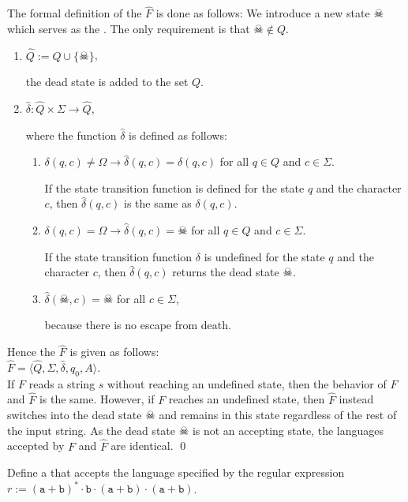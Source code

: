 The formal definition of the  $\widehat{F}$ is done as follows:
We introduce a new state $\skull$ which serves as the .  The only requirement is that $\skull \not\in Q$.
\begin{enumerate}
\item $\widehat{Q} := Q \cup \{ \skull \}$,

      the dead state is added to the set  $Q$.
\item $\widehat{\delta} : \widehat{Q} \times \Sigma \rightarrow \widehat{Q}$,

      where the function $\widehat{\delta}$ is defined as follows:
      \begin{enumerate}
      \item $\delta(q,c) \not= \Omega \rightarrow \widehat{\delta}(q,c) = \delta(q,c)$ \quad  for all $q \in Q$ and $c \in \Sigma$.

            If the state transition function is defined for the state  $q$ and the character
            $c$, then $\widehat{\delta}(q,c)$ is the same as $\delta(q,c)$.
      \item $\delta(q,c) = \Omega \rightarrow \widehat{\delta}(q,c) = \skull$  \quad for all $q \in Q$ and $c \in \Sigma$.

            If the state transition function $\delta$ is undefined for the state $q$ and the character
            $c$, then $\widehat{\delta}(q,c)$ returns the dead state $\skull$.
      \item $\widehat{\delta}(\skull, c) = \skull$ \quad for all $c \in \Sigma$,

            because there is no escape from death.
      \end{enumerate}
\end{enumerate}
Hence the   $\widehat{F}$ is given as follows:
\\[0.2cm]
\hspace*{1.3cm}
$\widehat{F} = \langle \widehat{Q}, \Sigma, \widehat{\delta}, q_0, A \rangle$.
\\[0.2cm]
If  $F$ reads a string $s$ without reaching an undefined state, then the behavior of $F$ and $\widehat{F}$ is the same.
However, if $F$ reaches an undefined state, then $\widehat{F}$ instead switches into the dead state 
$\skull$ and remains in this state regardless of the rest of the input string.  As the dead state $\skull$
is not an accepting state, the languages accepted by  $F$ and $\widehat{F}$ are identical. \qed 

\exerciseEng
Define a  that accepts the language specified by the regular expression 
\\[0.2cm]
\hspace*{1.3cm}
$r := (\texttt{a}+\texttt{b})^* \cdot \texttt{b} \cdot (\texttt{a}+\texttt{b}) \cdot
(\texttt{a}+\texttt{b})$. \eox

